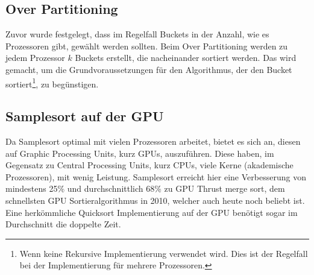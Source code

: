 	\subsection{Over Partitioning}
		Zuvor wurde festgelegt, dass im Regelfall Buckets in der Anzahl, wie es Prozessoren gibt, gewählt werden sollten.
		Beim Over Partitioning werden zu jedem Prozessor $k$ Buckets erstellt, die nacheinander sortiert werden.
		Das wird gemacht, um die Grundvoraussetzungen für den Algorithmus, der den Bucket sortiert\footnote{Wenn keine Rekursive Implementierung verwendet wird. Dies ist der Regelfall bei der Implementierung für mehrere Prozessoren.}, zu begünstigen.
	
	\subsection{Samplesort auf der GPU}
		Da Samplesort optimal mit vielen Prozessoren arbeitet, bietet es sich an, diesen auf Graphic Processing Units, kurz GPUs, auszuführen.
		Diese haben, im Gegensatz zu Central Processing Units, kurz CPUs, viele Kerne (akademische Prozessoren), mit wenig Leistung. \autocite{wikipedia-contributors-2022B}
		Samplesort erreicht hier eine Verbesserung von mindestens 25\% und durchschnittlich 68\% zu GPU Thrust merge sort, \autocite{leischner-2010} dem schnellsten GPU Sortieralgorithmus in 2010, welcher auch heute noch beliebt ist. \autocite{unknown-author-2016}
		Eine herkömmliche Quicksort Implementierung auf der GPU benötigt sogar im Durchschnitt die doppelte Zeit.
